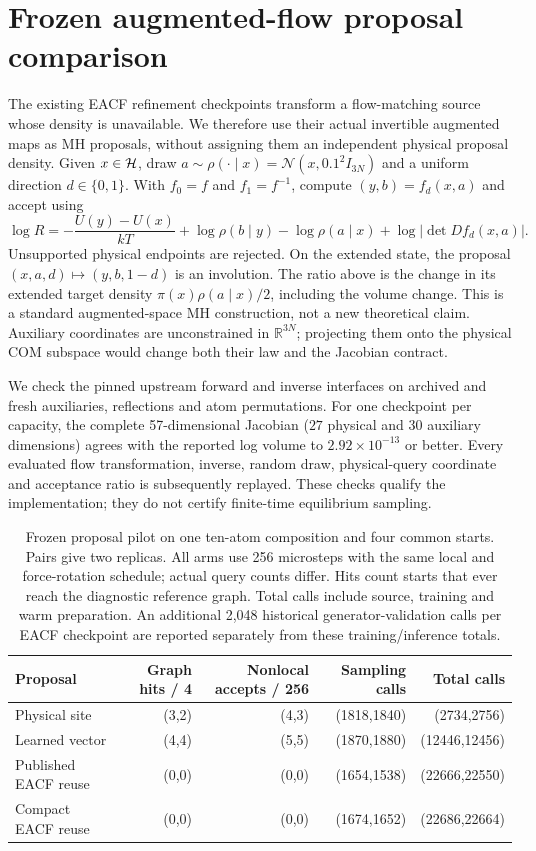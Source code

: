 \section{Frozen augmented-flow proposal comparison}
\label{app:eacf-directional}

The existing EACF refinement checkpoints transform a flow-matching source whose
density is unavailable. We therefore use their actual invertible augmented maps
as MH proposals, without assigning them an independent physical proposal density.
Given $x\in\mathcal H$, draw $a\sim\rho(\cdot\mid x)=\mathcal N(x,0.1^2I_{3N})$
and a uniform direction $d\in\{0,1\}$. With $f_0=f$ and $f_1=f^{-1}$, compute
$(y,b)=f_d(x,a)$ and accept using
\begin{equation}
 \log R=-\frac{U(y)-U(x)}{kT}
       +\log\rho(b\mid y)-\log\rho(a\mid x)
       +\log\left|\det Df_d(x,a)\right|.
\end{equation}
Unsupported physical endpoints are rejected. On the extended state, the proposal
$(x,a,d)\mapsto(y,b,1-d)$ is an involution. The ratio above is the change in its
extended target density $\pi(x)\rho(a\mid x)/2$, including the volume change.
This is a standard augmented-space MH construction, not a new theoretical claim.
Auxiliary coordinates are unconstrained in $\mathbb R^{3N}$; projecting them onto
the physical COM subspace would change both their law and the Jacobian contract.

We check the pinned upstream forward and inverse interfaces on archived and fresh
auxiliaries, reflections and atom permutations. For one checkpoint per capacity,
the complete 57-dimensional Jacobian ($27$ physical and $30$ auxiliary dimensions)
agrees with the reported log volume to $2.92\times10^{-13}$ or better.
Every evaluated flow transformation, inverse, random draw, physical-query
coordinate and acceptance ratio is subsequently replayed. These checks qualify
the implementation; they do not certify finite-time equilibrium sampling.

\begin{table}[h]
\centering\small
\caption{Frozen proposal pilot on one ten-atom composition and four common starts.
Pairs give two replicas. All arms use 256 microsteps with the same local and
force-rotation schedule; actual query counts differ. Hits count starts that ever
reach the diagnostic reference graph. Total calls include source, training and
warm preparation. An additional 2,048 historical generator-validation calls per
EACF checkpoint are reported separately from these training/inference totals.}
\begin{tabular}{lrrrr}
\toprule
Proposal & Graph hits / 4 & Nonlocal accepts / 256 & Sampling calls & Total calls\\
\midrule
Physical site & (3,2) & (4,3) & (1818,1840) & (2734,2756)\\
Learned vector & (4,4) & (5,5) & (1870,1880) & (12446,12456)\\
Published EACF reuse & (0,0) & (0,0) & (1654,1538) & (22666,22550)\\
Compact EACF reuse & (0,0) & (0,0) & (1674,1652) & (22686,22664)\\
\bottomrule
\end{tabular}
\end{table}

